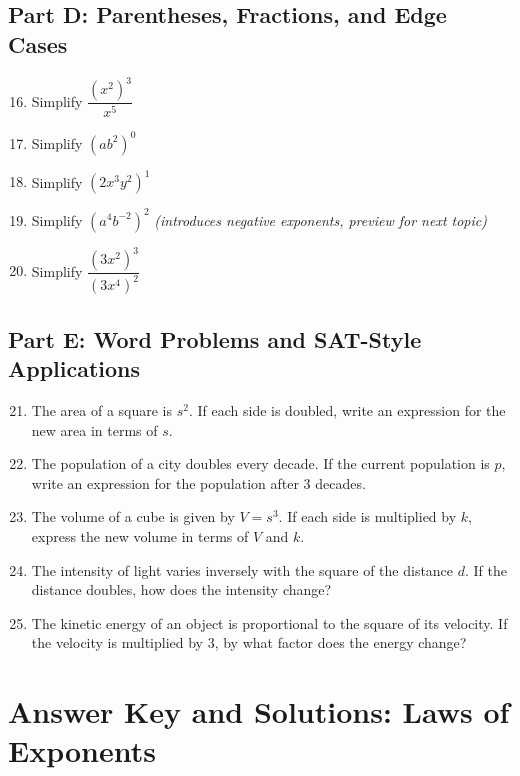 \documentclass[14pt]{extarticle}
\begin{document}
\subsection*{Part D: Parentheses, Fractions, and Edge Cases}
\begin{enumerate}
  \setcounter{enumi}{15}
  \item Simplify \(\dfrac{(x^2)^3}{x^5}\)
  \item Simplify \((ab^2)^0\)
  \item Simplify \((2x^3y^2)^1\)
  \item Simplify \((a^4b^{-2})^2\) \textit{(introduces negative exponents, preview for next topic)}
  \item Simplify \(\dfrac{(3x^2)^3}{(3x^4)^2}\)
\end{enumerate}

\subsection*{Part E: Word Problems and SAT-Style Applications}
\begin{enumerate}
  \setcounter{enumi}{20}
  \item The area of a square is \(s^2\). If each side is doubled, write an expression for the new area in terms of \(s\).
  \item The population of a city doubles every decade. If the current population is \(p\), write an expression for the population after 3 decades.
  \item The volume of a cube is given by \(V = s^3\). If each side is multiplied by \(k\), express the new volume in terms of \(V\) and \(k\).
  \item The intensity of light varies inversely with the square of the distance \(d\). If the distance doubles, how does the intensity change?
  \item The kinetic energy of an object is proportional to the square of its velocity. If the velocity is multiplied by 3, by what factor does the energy change?
\end{enumerate}

\newpage


\section*{Answer Key and Solutions: Laws of Exponents}
\end{document}

